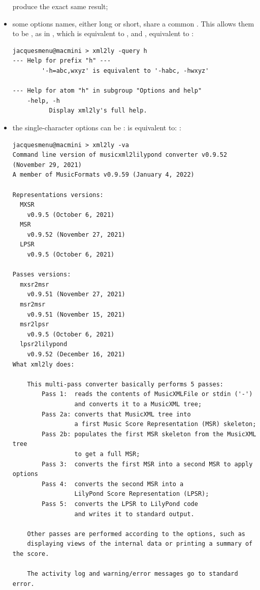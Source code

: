 \begin{itemize}
produce the exact same result;

\item some options names, either long or short, share a common . This allows them to be , as in , which is equivalent to , and , equivalent to :
\begin{lstlisting}[language=Terminal]
jacquesmenu@macmini > xml2ly -query h
--- Help for prefix "h" ---
        '-h=abc,wxyz' is equivalent to '-habc, -hwxyz'

--- Help for atom "h" in subgroup "Options and help"
    -help, -h
          Display xml2ly's full help.
\end{lstlisting}

\item the single-character options can be :  is equivalent to: :
\begin{lstlisting}[language=Terminal]
jacquesmenu@macmini > xml2ly -va
Command line version of musicxml2lilypond converter v0.9.52 (November 29, 2021)
A member of MusicFormats v0.9.59 (January 4, 2022)

Representations versions:
  MXSR
    v0.9.5 (October 6, 2021)
  MSR
    v0.9.52 (November 27, 2021)
  LPSR
    v0.9.5 (October 6, 2021)

Passes versions:
  mxsr2msr
    v0.9.51 (November 27, 2021)
  msr2msr
    v0.9.51 (November 15, 2021)
  msr2lpsr
    v0.9.5 (October 6, 2021)
  lpsr2lilypond
    v0.9.52 (December 16, 2021)
What xml2ly does:

    This multi-pass converter basically performs 5 passes:
        Pass 1:  reads the contents of MusicXMLFile or stdin ('-')
                 and converts it to a MusicXML tree;
        Pass 2a: converts that MusicXML tree into
                 a first Music Score Representation (MSR) skeleton;
        Pass 2b: populates the first MSR skeleton from the MusicXML tree
                 to get a full MSR;
        Pass 3:  converts the first MSR into a second MSR to apply options
        Pass 4:  converts the second MSR into a
                 LilyPond Score Representation (LPSR);
        Pass 5:  converts the LPSR to LilyPond code
                 and writes it to standard output.

    Other passes are performed according to the options, such as
    displaying views of the internal data or printing a summary of the score.

    The activity log and warning/error messages go to standard error.
\end{lstlisting}

\end{itemize}


